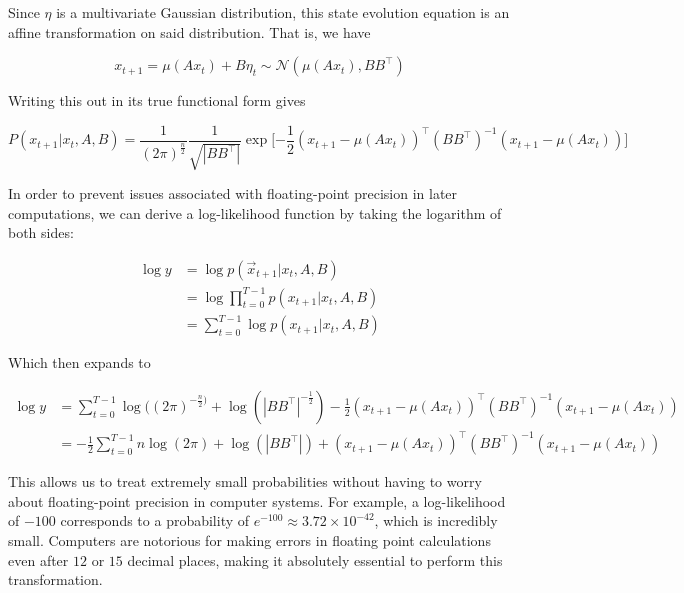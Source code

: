 \documentclass[12pt]{article}
\theoremstyle{definition}
\begin{document}
Since $\eta$ is a multivariate Gaussian distribution, this state evolution equation is an affine transformation on said distribution. That is, we have

\begin{equation}
    x_{t+1} = \mu(Ax_t) + B \eta_t \sim \mathcal{N}(\mu(Ax_t), BB^\top)
\end{equation}

Writing this out in its true functional form gives

\begin{equation}
    P(x_{t+1} | x_t, A, B) = \frac{1}{(2\pi)^{\frac{n}{2}}} \frac{1}{\sqrt{|BB^\top|}} \exp \big[{- \frac{1}{2}} (x_{t+1} - \mu(Ax_t))^\top (BB^\top)^{-1} (x_{t+1} - \mu(Ax_t)) \big]
\end{equation}

In order to prevent issues associated with floating-point precision in later computations, we can derive a log-likelihood function by taking the logarithm of both sides:

\begin{equation}
\begin{split}
    \log y & = \log p(\Vec{x}_{t+1} | x_t, A, B) \\ 
    & = \log \prod_{t=0}^{T - 1} p(x_{t+1} | x_t, A, B) \\ 
    & = \sum_{t=0}^{T - 1} \log p(x_{t+1} | x_t, A, B)
\end{split}
\end{equation}

Which then expands to 

\begin{equation}
\label{eqn:likelihoodFunction}
\begin{split}
    \log y &= \sum_{t=0}^{T - 1} \log((2\pi)^{-\frac{n}{2})} + \log(|BB^\top|^{-\frac{1}{2}}) - \frac{1}{2}(x_{t+1} - \mu(Ax_t))^\top (BB^\top)^{-1} (x_{t+1} - \mu(Ax_t)) \\ 
    &= - \frac{1}{2} \sum_{t=0}^{T - 1} n \log(2\pi) + \log(|BB^\top|) + (x_{t+1} - \mu(Ax_t))^\top (BB^\top)^{-1} (x_{t+1} - \mu(Ax_t))
\end{split}
\end{equation}

This allows us to treat extremely small probabilities without having to worry about floating-point precision in computer systems. For example, a log-likelihood of $-100$ corresponds to a probability of $ e^{-100} \approx 3.72 \times 10^{-42}$, which is incredibly small. Computers are notorious for making errors in floating point calculations even after $12$ or $15$ decimal places, making it absolutely essential to perform this transformation.
\end{document}
